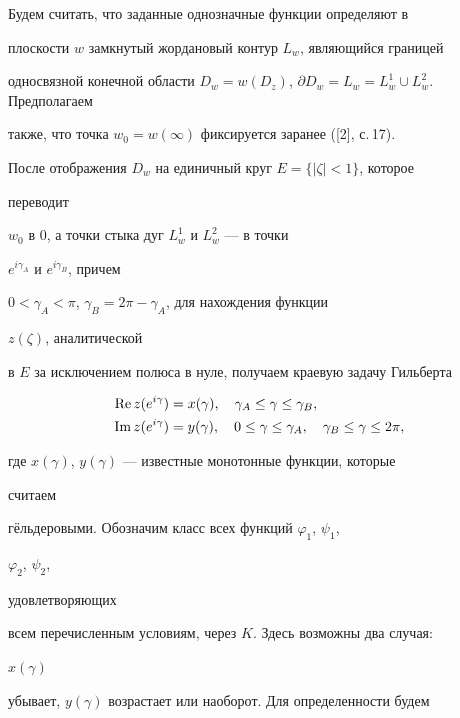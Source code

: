 Будем считать, что заданные однозначные функции определяют в  


плоскости $w$ замкнутый жордановый контур $L_w$, являющийся границей  


односвязной конечной области $D_w=w(D_z)$, $\partial D_w=L_w=L^1_w\cup 


L^2_w$. Предполагаем  


также, что точка $w_0=w(\infty)$ фиксируется заранее ([2], с.\,17).  


После отображения $D_w$ на единичный круг $E=\{|\zeta|<1\}$, которое 


переводит  


$w_0$ в 0, а точки стыка дуг $L^1_w$ и $L^2_w$ --- в точки 


$e^{i\gamma_A}$ и $e^{i\gamma_B}$, причем  


$0<\gamma_A<\pi$, $\gamma_B=2\pi-\gamma_A$, для нахождения функции 


$z(\zeta)$, аналитической  


в $E$ за исключением полюса в нуле, получаем краевую задачу Гильберта 


\begin{equation} 


\begin{split} 


\re z(e^{i\gamma})&=x(\gamma),\quad \gamma_A\le\gamma\le\gamma_B,\\ 


% 


\im z(e^{i\gamma})&=y(\gamma),\quad 0\le\gamma\le\gamma_A, 


\quad \gamma_B\le\gamma\le2\pi, 


\end{split} 


\end{equation} 


где $x(\gamma)$, $y(\gamma)$ --- известные монотонные функции, которые 


считаем  


г\"ельдеровыми. Обозначим класс всех функций $\varphi_1$, $\psi_1$, 


$\varphi_2$, $\psi_2$, 


удовлетворяющих  


всем перечисленным условиям, через $K$. Здесь возможны два случая: 


$x(\gamma)$ 


убывает, $y(\gamma)$ возрастает или наоборот. Для определенности будем 


